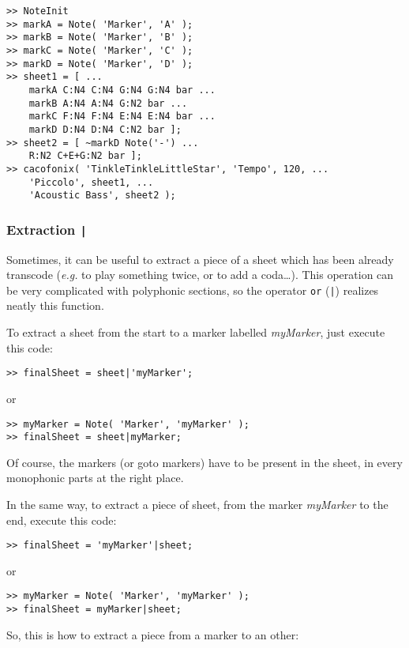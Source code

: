 \documentclass{article}
\newcommand{\eg}{\emph{e.g.}\xspace}
\begin{document}
\begin{lstlisting}
>> NoteInit
>> markA = Note( 'Marker', 'A' );
>> markB = Note( 'Marker', 'B' );
>> markC = Note( 'Marker', 'C' );
>> markD = Note( 'Marker', 'D' );
>> sheet1 = [ ...
	markA C:N4 C:N4 G:N4 G:N4 bar ...
	markB A:N4 A:N4 G:N2 bar ...
	markC F:N4 F:N4 E:N4 E:N4 bar ...
	markD D:N4 D:N4 C:N2 bar ];
>> sheet2 = [ ~markD Note('-') ...
	R:N2 C+E+G:N2 bar ];
>> cacofonix( 'TinkleTinkleLittleStar', 'Tempo', 120, ...
	'Piccolo', sheet1, ...
	'Acoustic Bass', sheet2 );
\end{lstlisting}

\subsubsection{Extraction \lstinline!|!}
\label{sec:Extraction}

Sometimes, it can be useful to extract a piece of a sheet which has been already transcode (\eg to play something twice, or to add a coda\dots). This operation can be very complicated with polyphonic sections, so the operator \lstinline!or! (\lstinline!|!) realizes neatly this function.

To extract a sheet from the start to a marker labelled \emph{myMarker}, just execute this code:
\begin{lstlisting}
>> finalSheet = sheet|'myMarker';
\end{lstlisting}
or
\begin{lstlisting}
>> myMarker = Note( 'Marker', 'myMarker' );
>> finalSheet = sheet|myMarker;
\end{lstlisting}
Of course, the markers (or goto markers) have to be present in the sheet, in every monophonic parts at the right place.

In the same way, to extract a piece of sheet, from the marker \emph{myMarker} to the end, execute this code:
\begin{lstlisting}
>> finalSheet = 'myMarker'|sheet;
\end{lstlisting}
or
\begin{lstlisting}
>> myMarker = Note( 'Marker', 'myMarker' );
>> finalSheet = myMarker|sheet;
\end{lstlisting}

So, this is how to extract a piece from a marker to an other: \\
\end{document}
